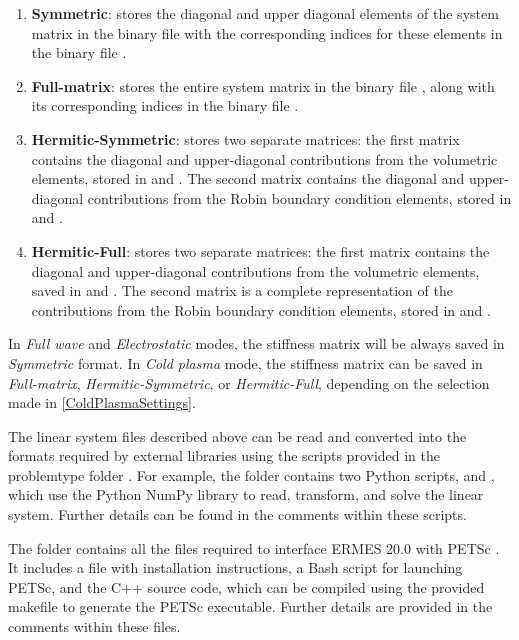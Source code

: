 \begin{enumerate}\itemsep0.5em 
	\item \textbf{Symmetric}: stores the diagonal and upper diagonal elements of the system matrix in the binary file  with the corresponding indices for these elements in the binary file .
	\quad
	\item \textbf{Full-matrix}: stores the entire system matrix in the binary file , along with its corresponding indices in the binary file .
    \quad
	\item \textbf{Hermitic-Symmetric}: stores two separate matrices: the first matrix contains the diagonal and upper-diagonal contributions from the volumetric elements, stored in  and . The second matrix contains the diagonal and upper-diagonal contributions from the Robin boundary condition elements, stored in  and .	
	\quad
	\item \textbf{Hermitic-Full}: stores two separate matrices: the first matrix contains the diagonal and upper-diagonal contributions from the volumetric elements, saved in  and . The second matrix is a complete representation of the contributions from the Robin boundary condition elements, stored in  and .
\end{enumerate}
In \textit{Full wave} and \textit{Electrostatic} modes, the stiffness matrix will be always saved in \textit{Symmetric} format. In \textit{Cold plasma} mode, the stiffness matrix can be saved in \textit{Full-matrix}, \textit{Hermitic-Symmetric}, or \textit{Hermitic-Full}, depending on the selection made in \ref{ColdPlasmaSettings}. 

The linear system files described above can be read and converted into the formats required by external libraries using the scripts provided in the problemtype folder . For example, the folder  contains two Python scripts,  and , which use the Python NumPy library \cite{NumPyWeb} to read, transform, and solve the linear system. Further details can be found in the comments within these scripts.

The folder  contains all the files required to interface ERMES 20.0 with PETSc \cite{PETScWeb}. It includes a  file with installation instructions, a Bash script for launching PETSc, and the C++ source code, which can be compiled using the provided makefile to generate the PETSc executable. Further details are provided in the comments within these files.